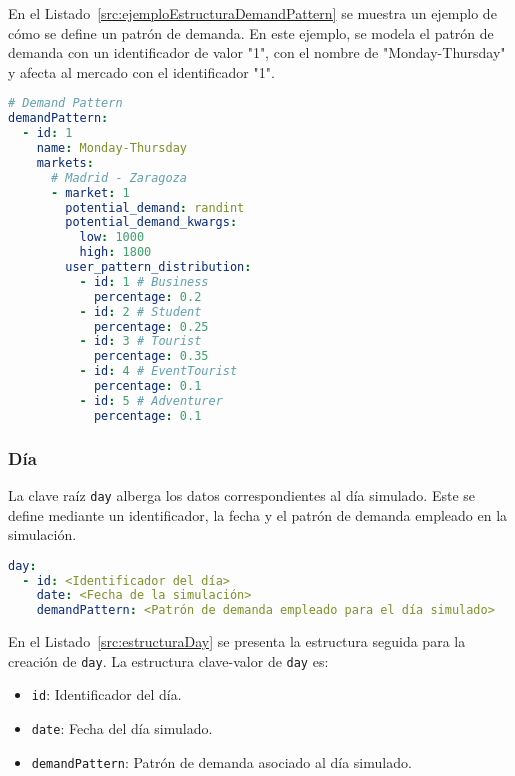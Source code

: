 En el Listado~\ref{src:ejemploEstructuraDemandPattern} se muestra un ejemplo de cómo se define un patrón de demanda. En este ejemplo, se modela el patrón de demanda con un identificador de valor "1", con el nombre de "Monday-Thursday" y afecta al mercado con el identificador "1".

\begin{lstlisting}[language=YAML,
                   frame=none,
                   numbers=none,
                   basicstyle=\ttfamily\normalsize,
                   caption={Ejemplo con datos reales de la estructura de \texttt{demandPattern}},
                   label=src:ejemploEstructuraDemandPattern,
                   inputencoding=utf8]
# Demand Pattern
demandPattern:
  - id: 1
    name: Monday-Thursday
    markets:
      # Madrid - Zaragoza
      - market: 1
        potential_demand: randint
        potential_demand_kwargs:
          low: 1000
          high: 1800
        user_pattern_distribution:
          - id: 1 # Business
            percentage: 0.2
          - id: 2 # Student
            percentage: 0.25
          - id: 3 # Tourist
            percentage: 0.35
          - id: 4 # EventTourist
            percentage: 0.1
          - id: 5 # Adventurer
            percentage: 0.1
\end{lstlisting}

\subsubsection{Día}

La clave raíz \texttt{day} alberga los datos correspondientes al día simulado. Este se define mediante un identificador, la fecha y el patrón de demanda empleado en la simulación.

\begin{lstlisting}[language=YAML,
                   frame=none,
                   numbers=none,
                   basicstyle=\ttfamily\normalsize,
                   caption={Estructura de la clave raíz \texttt{day}},
                   label=src:estructuraDay,
                   inputencoding=utf8]
day:
  - id: <Identificador del día>
    date: <Fecha de la simulación>
    demandPattern: <Patrón de demanda empleado para el día simulado>
\end{lstlisting}

En el Listado~\ref{src:estructuraDay} se presenta la estructura seguida para la creación de \texttt{day}. La estructura clave-valor de \texttt{day} es:

\begin{itemize}
    \item \texttt{id}: Identificador del día.
    \item \texttt{date}: Fecha del día simulado.
    \item \texttt{demandPattern}: Patrón de demanda asociado al día simulado.
\end{itemize}

